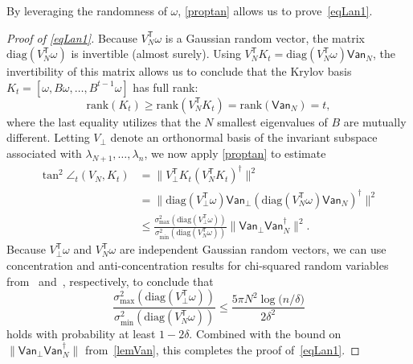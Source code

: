 \documentclass{siamart190516}
\newcommand{\Ttran}{\mathsf{T}}
\newcommand{\van}{\mathsf{Van}}
\newcommand{\rk}{\mathrm{rank}}
\providecommand{\diagM}[1]{\mathrm{diag}(#1)}
\providecommand{\norm}[1]{\lVert#1\rVert}
\begin{document}
By leveraging the randomness of $\omega$, \cref{proptan} allows us to prove~\cref{eqLan1}.
\begin{proof}[Proof of \cref{eqLan1}]
Because $V_{N}^{\Ttran}\omega$ is a Gaussian random vector, the matrix 
$\diagM{V_{N}^{\Ttran}\omega}$ is invertible (almost surely). Using $V_{N}^{\Ttran}K_{t} = \diagM{V_{N}^{\Ttran}\omega}\van_{N}$, the invertibility of this matrix allows us to conclude that the Krylov basis $K_{t} = [\omega,B\omega,\dotsc,B^{t-1}\omega]$ has full rank:
    \begin{equation}
        \label{fullrk}
        \rk(K_{t})\geq \rk(V_{N}^{\Ttran}K_{t}) = \rk(\van_{N})=t,
    \end{equation}
    where the last equality utilizes that the $N$ smallest eigenvalues of $B$ are mutually different.
Letting $V_{\perp}$ denote an orthonormal basis of the invariant subspace associated with $\lambda_{N+1},\dotsc,\lambda_{n}$, we now apply \cref{proptan} to estimate
    \begin{equation}
        \label{decoupleV}
        \begin{aligned}
            \tan^{2}\angle_{t}(V_{N},K_{t}) &=  \norm{V_{\perp}^{\Ttran}K_{t}(V_{N}^{\Ttran}K_{t})^{\dagger}}^{2} \\ 
            &= \norm{\diagM{V_{\perp}^{\Ttran}\omega}\van_{\perp}(\diagM{V_{N}^{\Ttran}\omega}\van_{N})^{\dagger}}^{2}\\
            &\leq \frac{\sigma_{\max}^{2}(\diagM{V_{\perp}^{\Ttran}\omega})}{\sigma_{\min}^{2}(\diagM{V_{N}^{\Ttran}\omega})}\norm{\van_{\perp}\van_{N}^{\dagger}}^{2}.
        \end{aligned}
    \end{equation}
    Because $V_{\perp}^{\Ttran}\omega$ and $V_{N}^{\Ttran}\omega$ are independent Gaussian random vectors, we can use concentration and anti-concentration results for chi-squared random variables from~\cite[Lemma~1]{Laurent2000} and~\cite[Lemma~4]{Meyer2023}, respectively, to conclude that
    \begin{equation*}
        \frac{\sigma_{\max}^{2}(\diagM{V_{\perp}^{\Ttran}\omega})}{\sigma_{\min}^{2}(\diagM{V_{N}^{\Ttran}\omega})}\leq \frac{5\pi N^{2}\log\bigl(n/\delta\bigr)}{2\delta^{2}}
    \end{equation*}
    holds with probability at least $1-2\delta$. Combined with the bound
    on $\norm{\van_{\perp}\van_{N}^{\dagger}}$ from~\cref{lemVan}, this completes the proof of~\cref{eqLan1}.
\end{proof}
\end{document}
